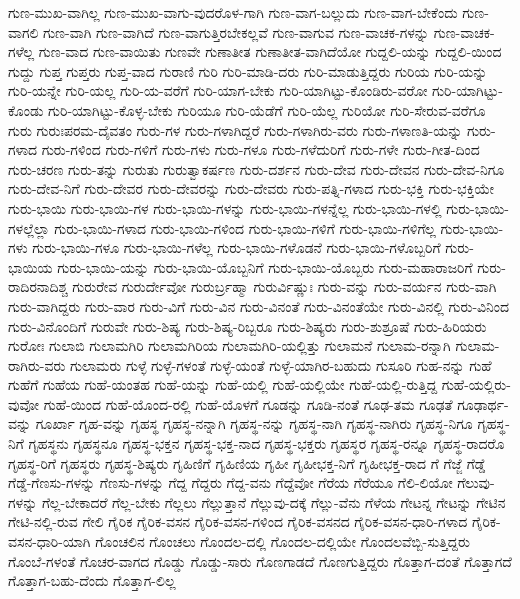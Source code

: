 {ಗುಣ-ಮುಖ-ವಾಗಿಲ್ಲ
ಗುಣ-ಮುಖ-ವಾಗು-ವುದರೊಳ-ಗಾಗಿ
ಗುಣ-ವಾಗ-ಬಲ್ಲುದು
ಗುಣ-ವಾಗ-ಬೇಕೆಂದು
ಗುಣ-ವಾಗಲಿ
ಗುಣ-ವಾಗಿ
ಗುಣ-ವಾಗಿದೆ
ಗುಣ-ವಾಗುತ್ತಿರಬೇಕಲ್ಲವೆ
ಗುಣ-ವಾಗುವ
ಗುಣ-ವಾಚಕ-ಗಳನ್ನು
ಗುಣ-ವಾಚಕ-ಗಳೆಲ್ಲ
ಗುಣ-ವಾದ
ಗುಣ-ವಾಯಿತು
ಗುಣವೇ
ಗುಣಾತೀತ
ಗುಣಾತೀತ-ವಾಗಿದೆಯೋ
ಗುದ್ದಲಿ-ಯನ್ನು
ಗುದ್ದಲಿ-ಯಿಂದ
ಗುದ್ದು
ಗುಪ್ತ
ಗುಪ್ತರು
ಗುಪ್ತ-ವಾದ
ಗುರಾಣಿ
ಗುರಿ
ಗುರಿ-ಮಾಡಿ-ದರು
ಗುರಿ-ಮಾಡುತ್ತಿದ್ದರು
ಗುರಿಯ
ಗುರಿ-ಯನ್ನು
ಗುರಿ-ಯನ್ನೇ
ಗುರಿ-ಯಲ್ಲ
ಗುರಿ-ಯ-ವರೆಗೆ
ಗುರಿ-ಯಾಗ-ಬೇಕು
ಗುರಿ-ಯಾಗಿಟ್ಟು-ಕೊಂಡಿರು-ವರೋ
ಗುರಿ-ಯಾಗಿಟ್ಟು-ಕೊಂಡು
ಗುರಿ-ಯಾಗಿಟ್ಟು-ಕೊಳ್ಳ-ಬೇಕು
ಗುರಿಯೂ
ಗುರಿ-ಯೆಡೆಗೆ
ಗುರಿ-ಯೆಲ್ಲ
ಗುರಿಯೋ
ಗುರಿ-ಸೇರುವ-ವರೆಗೂ
ಗುರು
ಗುರುಃಪರಮ-ದೈವತಂ
ಗುರು-ಗಳ
ಗುರು-ಗಳಾಗಿದ್ದರೆ
ಗುರು-ಗಳಾಗಿರು-ವರು
ಗುರು-ಗಳಾಣತಿ-ಯನ್ನು
ಗುರು-ಗಳಾದ
ಗುರು-ಗಳಿಂದ
ಗುರು-ಗಳಿಗೆ
ಗುರು-ಗಳು
ಗುರು-ಗಳೂ
ಗುರು-ಗಳೆದುರಿಗೆ
ಗುರು-ಗಳೇ
ಗುರು-ಗೀತ-ದಿಂದ
ಗುರು-ಚರಣ
ಗುರು-ತನ್ನು
ಗುರುತು
ಗುರುತ್ವಾಕರ್ಷಣ
ಗುರು-ದರ್ಶನ
ಗುರು-ದೇವ
ಗುರು-ದೇವನ
ಗುರು-ದೇವ-ನಿಗೂ
ಗುರು-ದೇವ-ನಿಗೆ
ಗುರು-ದೇವರ
ಗುರು-ದೇವರನ್ನು
ಗುರು-ದೇವರು
ಗುರು-ಪತ್ನಿ-ಗಳಾದ
ಗುರು-ಭಕ್ತಿ
ಗುರು-ಭಕ್ತಿಯೇ
ಗುರು-ಭಾಯಿ
ಗುರು-ಭಾಯಿ-ಗಳ
ಗುರು-ಭಾಯಿ-ಗಳನ್ನು
ಗುರು-ಭಾಯಿ-ಗಳನ್ನೆಲ್ಲ
ಗುರು-ಭಾಯಿ-ಗಳಲ್ಲಿ
ಗುರು-ಭಾಯಿ-ಗಳಲ್ಲೆಲ್ಲಾ
ಗುರು-ಭಾಯಿ-ಗಳಾದ
ಗುರು-ಭಾಯಿ-ಗಳಿಂದ
ಗುರು-ಭಾಯಿ-ಗಳಿಗೆ
ಗುರು-ಭಾಯಿ-ಗಳಿಗೆಲ್ಲ
ಗುರು-ಭಾಯಿ-ಗಳು
ಗುರು-ಭಾಯಿ-ಗಳೂ
ಗುರು-ಭಾಯಿ-ಗಳೆಲ್ಲ
ಗುರು-ಭಾಯಿ-ಗಳೊಡನೆ
ಗುರು-ಭಾಯಿ-ಗಳೊಬ್ಬರಿಗೆ
ಗುರು-ಭಾಯಿಯ
ಗುರು-ಭಾಯಿ-ಯನ್ನು
ಗುರು-ಭಾಯಿ-ಯೊಬ್ಬನಿಗೆ
ಗುರು-ಭಾಯಿ-ಯೊಬ್ಬರು
ಗುರು-ಮಹಾರಾಜರಿಗೆ
ಗುರು-ರಾದಿರನಾದಿಶ್ಚ
ಗುರುರೇವ
ಗುರುರ್ದೇವೋ
ಗುರುರ್ಬ್ರಹ್ಮಾ
ಗುರುರ್ವಿಷ್ಣುಃ
ಗುರು-ವನ್ನು
ಗುರು-ವರ್ಯನ
ಗುರು-ವಾಗಿ
ಗುರು-ವಾಗಿದ್ದರು
ಗುರು-ವಾರ
ಗುರು-ವಿಗೆ
ಗುರು-ವಿನ
ಗುರು-ವಿನಂತೆ
ಗುರು-ವಿನಂತೆಯೇ
ಗುರು-ವಿನಲ್ಲಿ
ಗುರು-ವಿನಿಂದ
ಗುರು-ವಿನೊಂದಿಗೆ
ಗುರುವೇ
ಗುರು-ಶಿಷ್ಯ
ಗುರು-ಶಿಷ್ಯ-ರಿಬ್ಬರೂ
ಗುರು-ಶಿಷ್ಯರು
ಗುರು-ಶುಶ್ರೂಷೆ
ಗುರು-ಹಿರಿಯರು
ಗುರೋಃ
ಗುಲಾಬಿ
ಗುಲಾಮಗಿರಿ
ಗುಲಾಮಗಿರಿಯ
ಗುಲಾಮಗಿರಿ-ಯಲ್ಲಿತ್ತು
ಗುಲಾಮನೆ
ಗುಲಾಮ-ರನ್ನಾಗಿ
ಗುಲಾಮ-ರಾಗಿರು-ವರು
ಗುಲಾಮರು
ಗುಳ್ಳೆ
ಗುಳ್ಳೆ-ಗಳಂತೆ
ಗುಳ್ಳೆ-ಯಂತೆ
ಗುಳ್ಳೆ-ಯಾಗಿರ-ಬಹುದು
ಗುಸೂರಿ
ಗುಹ-ನನ್ನು
ಗುಹೆ
ಗುಹೆಗೆ
ಗುಹೆಯ
ಗುಹೆ-ಯಂತಹ
ಗುಹೆ-ಯನ್ನು
ಗುಹೆ-ಯಲ್ಲಿ
ಗುಹೆ-ಯಲ್ಲಿಯೇ
ಗುಹೆ-ಯಲ್ಲಿ-ರುತ್ತಿದ್ದ
ಗುಹೆ-ಯಲ್ಲಿರು-ವುವೋ
ಗುಹೆ-ಯಿಂದ
ಗುಹೆ-ಯೊಂದ-ರಲ್ಲಿ
ಗುಹೆ-ಯೊಳಗೆ
ಗೂಡನ್ನು
ಗೂಡಿ-ನಂತೆ
ಗೂಢ-ತಮ
ಗೂಢತೆ
ಗೂಢಾರ್ಥ-ವನ್ನು
ಗೂರ್ಖಾ
ಗೃಹ-ವನ್ನು
ಗೃಹಸ್ಥ
ಗೃಹಸ್ಥ-ನನ್ನಾಗಿ
ಗೃಹಸ್ಥ-ನನ್ನು
ಗೃಹಸ್ಥ-ನಾಗಿ
ಗೃಹಸ್ಥ-ನಾಗಿರು
ಗೃಹಸ್ಥ-ನಿಗೂ
ಗೃಹಸ್ಥ-ನಿಗೆ
ಗೃಹಸ್ಥನು
ಗೃಹಸ್ಥನೂ
ಗೃಹಸ್ಥ-ಭಕ್ತನ
ಗೃಹಸ್ಥ-ಭಕ್ತ-ನಾದ
ಗೃಹಸ್ಥ-ಭಕ್ತರು
ಗೃಹಸ್ಥರ
ಗೃಹಸ್ಥ-ರನ್ನೂ
ಗೃಹಸ್ಥ-ರಾದರೊ
ಗೃಹಸ್ಥ-ರಿಗೆ
ಗೃಹಸ್ಥರು
ಗೃಹಸ್ಥ-ಶಿಷ್ಯರು
ಗೃಹಿಣಿಗೆ
ಗೃಹಿಣಿಯ
ಗೃಹೀ
ಗೃಹೀಭಕ್ತ-ನಿಗೆ
ಗೃಹೀಭಕ್ತ-ರಾದ
ಗೆ
ಗೆಜ್ಜೆ
ಗೆಡ್ಡೆ
ಗೆಡ್ಡೆ-ಗೆಣಸು-ಗಳನ್ನು
ಗೆಣಸು-ಗಳನ್ನು
ಗೆದ್ದ
ಗೆದ್ದರು
ಗೆದ್ದ-ವನು
ಗೆದ್ದೆವೋ
ಗೆರೆಯ
ಗೆರೆಯೂ
ಗೆಲಿ-ಲಿಯೋ
ಗೆಲುವು-ಗಳನ್ನು
ಗೆಲ್ಲ-ಬೇಕಾದರೆ
ಗೆಲ್ಲ-ಬೇಕು
ಗೆಲ್ಲಲು
ಗೆಲ್ಲುತ್ತಾನೆ
ಗೆಲ್ಲುವು-ದಕ್ಕೆ
ಗೆಲ್ಲು-ವೆನು
ಗೆಳೆಯ
ಗೇಟನ್ನ
ಗೇಟನ್ನು
ಗೇಟಿನ
ಗೇಟಿ-ನಲ್ಲಿ-ರುವ
ಗೇಲಿ
ಗೈರಿಕ
ಗೈರಿಕ-ವಸನ
ಗೈರಿಕ-ವಸನ-ಗಳಿಂದ
ಗೈರಿಕ-ವಸನದ
ಗೈರಿಕ-ವಸನ-ಧಾರಿ-ಗಳಾದ
ಗೈರಿಕ-ವಸನ-ಧಾರಿ-ಯಾಗಿ
ಗೊಂಚಲಿನ
ಗೊಂಚಲು
ಗೊಂದಲ-ದಲ್ಲಿ
ಗೊಂದಲ-ದಲ್ಲಿಯೇ
ಗೊಂದಲವೆಬ್ಬಿ-ಸುತ್ತಿದ್ದರು
ಗೊಂಬೆ-ಗಳಂತೆ
ಗೊಚರ-ವಾಗದ
ಗೊಡ್ಡು
ಗೊಡ್ಡು-ಸಾರು
ಗೊಣಗಾಡದೆ
ಗೊಣಗುತ್ತಿದ್ದರು
ಗೊತ್ತಾಗ-ದಂತೆ
ಗೊತ್ತಾಗದೆ
ಗೊತ್ತಾಗ-ಬಹು-ದೆಂದು
ಗೊತ್ತಾಗ-ಲಿಲ್ಲ
}
